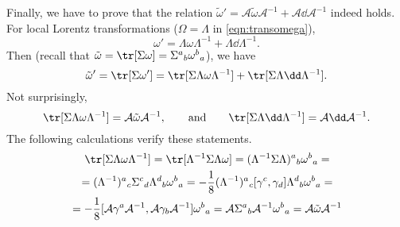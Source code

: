 \documentclass[a4paper,12pt]{book}
\begin{document}
\begin{itemize}
Finally, we have to prove that the relation $\tilde\omega'=\mathcal A\tilde\omega\mathcal A^{-1}+\mathcal A\dd \mathcal A^{-1}$ indeed holds. For local Lorentz transformations ($\Omega=\Lambda$ in \cref{eqn:transomega}),
\[\omega'=\Lambda\omega\Lambda^{-1}+\Lambda\dd\Lambda^{-1}.\]
Then (recall that $\tilde\omega=\tr[\Sigma\omega]=\Sigma^a{}_b\omega^b{}_a$), we have
\[\tilde\omega'=\tr[\Sigma\omega']=\tr[\Sigma\Lambda\omega\Lambda^{-1}]+\tr[\Sigma\Lambda\dd\Lambda^{-1}].\]
Not surprisingly,
\[\tr[\Sigma\Lambda\omega\Lambda^{-1}]=\mathcal A\tilde\omega\mathcal A^{-1},\qquad\text{and}\qquad\tr[\Sigma\Lambda\dd\Lambda^{-1}]=\mathcal A\dd\mathcal A^{-1}.\]
The following calculations verify these statements.
\begin{multline*}
\tr[\Sigma\Lambda\omega\Lambda^{-1}]=\tr[\Lambda^{-1}\Sigma\Lambda\omega]=(\Lambda^{-1}\Sigma\Lambda)^a{}_b\omega^b{}_a=\\
=(\Lambda^{-1})^a{}_c\Sigma^c{}_d\Lambda^d{}_b\omega^b{}_a=-\frac{1}{8}(\Lambda^{-1})^a{}_c[\gamma^c,\gamma_d]\Lambda^d{}_b\omega^b{}_a=\\
=-\frac{1}{8}[\mathcal A\gamma^a\mathcal A^{-1},\mathcal A\gamma_b\mathcal A^{-1}]\omega^b{}_a=\mathcal A\Sigma^a{}_b\mathcal A^{-1}\omega^b{}_a=\mathcal A\tilde\omega\mathcal A^{-1}
\end{multline*}


\end{itemize}
\end{document}
